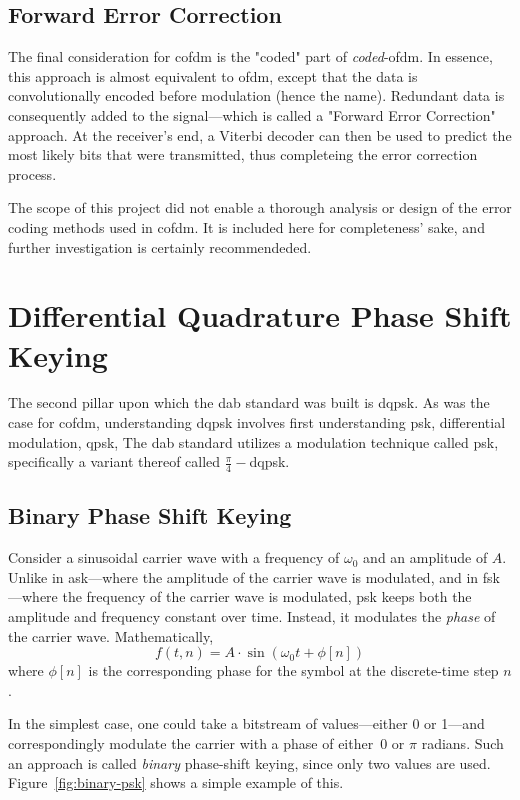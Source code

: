 \documentclass[class=report,11pt,crop=false]{standalone}
\begin{document}
\subsection{Forward Error Correction}
The final consideration for \gls{cofdm} is the "coded" part of \emph{coded}-\gls{ofdm}. In essence, this approach is almost equivalent to \gls{ofdm}, except that the data is convolutionally encoded before modulation (hence the name). Redundant data is consequently added to the signal---which is called a "Forward Error Correction" approach. At the receiver's end, a Viterbi decoder can then be used to predict the most likely bits that were transmitted, thus completeing the error correction process.

The scope of this project did not enable a thorough analysis or design of the error coding methods used in \gls{cofdm}. It is included here for completeness' sake, and further investigation is certainly recommendeded.

\section{Differential Quadrature Phase Shift Keying \label{sect:dab-std_psk}}
The second pillar upon which the \gls{dab} standard was built is \acrfull{dqpsk}. As was the case for \gls{cofdm}, understanding \gls{dqpsk} involves first understanding \gls{psk}, differential modulation, \gls{qpsk}, 
The \gls{dab} standard utilizes a modulation technique called \acrlong{psk}, specifically a variant thereof called \(\frac{\pi}{4}-\)\gls{dqpsk}.

\subsection{Binary Phase Shift Keying}
Consider a sinusoidal carrier wave with a frequency of \(\omega_0\) and an amplitude of \(A\). Unlike in \gls{ask}---where the amplitude of the carrier wave is modulated, and in \gls{fsk}---where the frequency of the carrier wave is modulated, \gls{psk} keeps both the amplitude and frequency constant over time. Instead, it modulates the \emph{phase} of the carrier wave. Mathematically,
\begin{equation}
    f(t, n) = A \cdot \sin(\omega_0t + \phi[n])
\end{equation}
where \(\phi[n]\) is the corresponding phase for the symbol at the discrete-time step \(n\).

In the simplest case, one could take a bitstream of values---either 0 or 1---and correspondingly modulate the carrier with a phase of either~\(0\) or \(\pi\) radians. Such an approach is called \emph{binary} phase-shift keying, since only two values are used. Figure~\ref{fig:binary-psk} shows a simple example of this.
\end{document}
